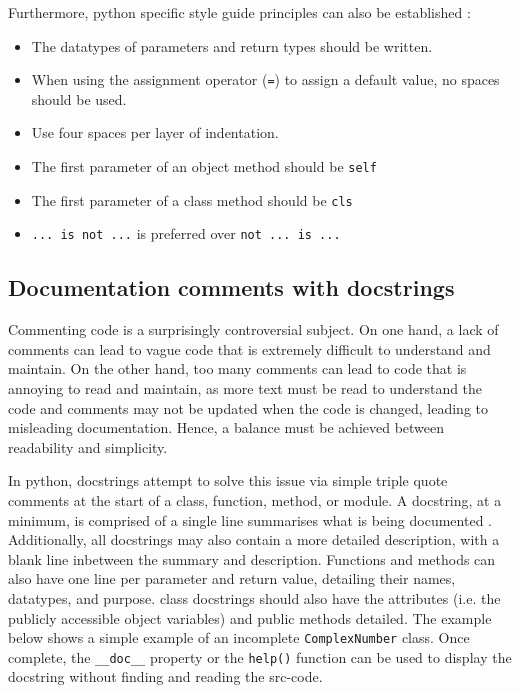 \documentclass[11pt]{article}
\begin{document}
\noindent
Furthermore, \Gls{python} specific style guide principles can also be established \cite{python-style}:

\begin{itemize}
    \item The datatypes of parameters and return types should be written.
    \item When using the assignment operator (\texttt{=}) to assign a default value, no spaces should be used.
    \item Use four spaces per layer of indentation.
    \item The first parameter of an \gls{object} method should be \texttt{self}
    \item The first parameter of a \gls{class} method should be \texttt{cls}
    \item \texttt{... is not ...} is preferred over \texttt{not ... is ...}
\end{itemize}

\subsection{Documentation comments with docstrings}

Commenting code is a surprisingly controversial subject. On one hand, a lack of comments can lead to vague code that is extremely difficult to understand and maintain. On the other hand, too many comments can lead to code that is annoying to read and maintain, as more text must be read to understand the code and comments may not be updated when the code is changed, leading to misleading documentation. Hence, a balance must be achieved between readability and simplicity.

In \Gls{python}, \glspl{docstring} attempt to solve this issue via simple triple quote comments at the start of a class, function, method, or module. A docstring, at a minimum, is comprised of a single line summarises what is being documented \cite{python-docstring}. Additionally, all \glspl{docstring} may also contain a more detailed description, with a blank line inbetween the summary and description. Functions and methods can also have one line per parameter and return value, detailing their names, datatypes, and purpose. \Gls{class} \glspl{docstring} should also have the attributes (i.e. the publicly accessible \gls{object} variables) and public methods detailed. The example below shows a simple example of an incomplete \texttt{ComplexNumber} \gls{class}. Once complete, the \texttt{__doc__} property or the \texttt{help()} function can be used to display the docstring without finding and reading the \gls{src-code}.
\end{document}
